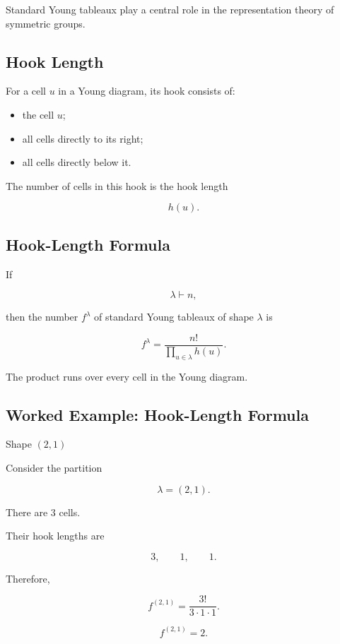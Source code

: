 Standard Young tableaux play a central role in the representation theory
of symmetric groups.

\subsection{Hook Length}
\label{subsec:hook-length}

For a cell \(u\) in a Young diagram, its hook consists of:

\begin{itemize}
    \item the cell \(u\);
    \item all cells directly to its right;
    \item all cells directly below it.
\end{itemize}

The number of cells in this hook is the hook length

\[
\boxed{
h(u).
}
\]

\subsection{Hook-Length Formula}
\label{subsec:hook-length-formula}

\begin{theorem}
If

\[
\lambda\vdash n,
\]

then the number \(f^\lambda\) of standard Young tableaux of shape
\(\lambda\) is

\[
\boxed{
f^\lambda
=
\frac{n!}{
\prod_{u\in\lambda}h(u)
}.
}
\]
\end{theorem}

The product runs over every cell in the Young diagram.

\subsection{Worked Example: Hook-Length Formula}
\label{subsec:worked-hook-length}

\begin{workedexamplebox}{Shape \((2,1)\)}

Consider the partition

\[
\lambda=(2,1).
\]

There are \(3\) cells.

Their hook lengths are

\[
3,\qquad1,\qquad1.
\]

Therefore,

\[
f^{(2,1)}
=
\frac{3!}{3\cdot1\cdot1}.
\]

\begin{answerbox}
\[
\boxed{
f^{(2,1)}=2.
}
\]
\end{answerbox}

\end{workedexamplebox}

